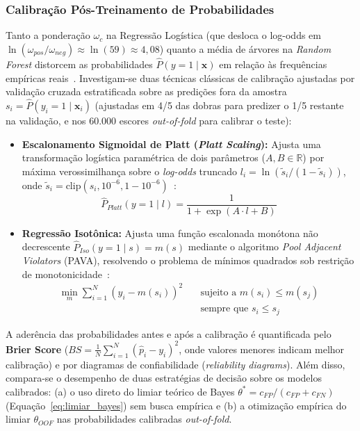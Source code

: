 \documentclass[conference]{IEEEtran}
\begin{document}
\subsubsection{Calibração Pós-Treinamento de Probabilidades}
Tanto a ponderação $\omega_c$ na Regressão Logística (que desloca o log-odds em $\ln(\omega_{pos}/\omega_{neg}) \approx \ln(59) \approx 4{,}08$) quanto a média de árvores na \textit{Random Forest} distorcem as probabilidades $\hat{P}(y=1 \mid \mathbf{x})$ em relação às frequências empíricas reais~\cite{niculescu2005predicting,dalpozzolo2015calibrating}. Investigam-se duas técnicas clássicas de calibração ajustadas por validação cruzada estratificada sobre as predições fora da amostra $s_i = \hat{P}(y_i=1 \mid \mathbf{x}_i)$ (ajustadas em 4/5 das dobras para predizer o 1/5 restante na validação, e nos 60.000 escores \textit{out-of-fold} para calibrar o teste):
\begin{itemize}
    \item \textbf{Escalonamento Sigmoidal de Platt (\textit{Platt Scaling}):} Ajusta uma transformação logística paramétrica de dois parâmetros ($A, B \in \mathbb{R}$) por máxima verossimilhança sobre o \textit{log-odds} truncado $l_i = \ln(\tilde{s}_i / (1 - \tilde{s}_i))$, onde $\tilde{s}_i = \text{clip}(s_i, 10^{-6}, 1-10^{-6})$~\cite{niculescu2005predicting}:
    \begin{equation}
        \hat{P}_{Platt}(y=1 \mid l) = \frac{1}{1 + \exp(A \cdot l + B)}
    \end{equation}
    \item \textbf{Regressão Isotônica:} Ajusta uma função escalonada monótona não decrescente $\hat{P}_{Iso}(y=1 \mid s) = m(s)$ mediante o algoritmo \textit{Pool Adjacent Violators} (PAVA), resolvendo o problema de mínimos quadrados sob restrição de monotonicidade~\cite{zadrozny2002transforming}:
    \begin{equation}
    \begin{aligned}
        \min_{m} \sum_{i=1}^{N} \left(y_i - m(s_i)\right)^2 \quad &\text{sujeito a } m(s_i) \le m(s_j) \\
        &\text{sempre que } s_i \le s_j
    \end{aligned}
    \end{equation}
\end{itemize}
A aderência das probabilidades antes e após a calibração é quantificada pelo \textbf{Brier Score} ($BS = \frac{1}{N}\sum_{i=1}^N (\hat{p}_i - y_i)^2$, onde valores menores indicam melhor calibração) e por diagramas de confiabilidade (\textit{reliability diagrams}). Além disso, compara-se o desempenho de duas estratégias de decisão sobre os modelos calibrados: (a) o uso direto do limiar teórico de Bayes $\theta^* = c_{FP}/(c_{FP}+c_{FN})$ (Equação~\ref{eq:limiar_bayes}) sem busca empírica e (b) a otimização empírica do limiar $\theta_{OOF}$ nas probabilidades calibradas \textit{out-of-fold}.
\end{document}
